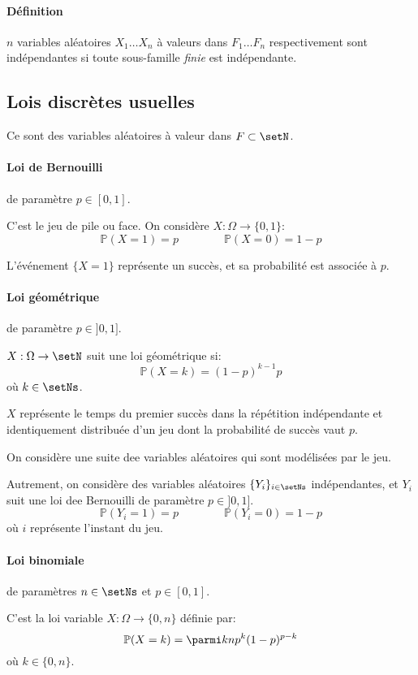 \documentclass[a4paper,10pt,french,openany]{memoir}
\newcommand{\Proba}{\mathbb{P}}
\begin{document}
\paragraph{Définition}
$n$ variables aléatoires $X_1\dots X_n$ à valeurs dans $F_1\dots F_n$ respectivement sont indépendantes si toute sous-famille \emph{finie} est indépendante.

\subsection{Lois discrètes usuelles}

Ce sont des variables aléatoires à valeur dans $F \subset \setN$.

\paragraph{Loi de Bernouilli} de paramètre $p \in [0,1]$.

C'est le jeu de pile ou face. On considère $X: \Omega \rightarrow \{0,1\}$:
\[ \Proba(X=1)=p \qquad\qquad \Proba(X=0)=1-p \]

L'événement $\{X=1\}$ représente un succès, et sa probabilité est associée à $p$.

\paragraph{Loi géométrique} de paramètre $p \in ]0,1]$.

$X:\Omega \rightarrow \setN$ suit une loi géométrique si:
\[ \Proba(X=k)=(1-p)^{k-1}p \]
où $k \in \setNs$.

$X$ représente le temps du premier succès dans la répétition indépendante et identiquement distribuée d'un jeu dont la probabilité de succès vaut $p$.

On considère une suite dee variables aléatoires qui sont modélisées par le jeu.

Autrement, on considère des variables aléatoires $\{Y_i\}_{i\in \setNs}$ indépendantes, et $Y_i$ suit une loi dee Bernouilli de paramètre $p\in ]0,1]$.
\[ \Proba(Y_i = 1) = p \qquad\qquad \Proba(Y_i=0)=1-p \]
où $i$ représente l'instant du jeu.

\paragraph{Loi binomiale} de paramètres $n\in \setNs$ et $p\in [0,1]$.

C'est la loi variable $X:\Omega \rightarrow \{0,n\}$ définie par: 
\[\Proba(X=k)=\parmi k n p^k (1-p)^{p-k}\]
où $k \in \{0,n\}$.
\end{document}
